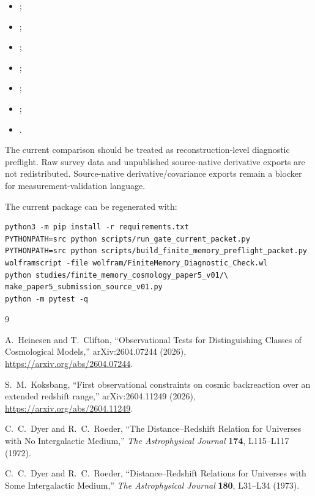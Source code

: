 \documentclass[11pt]{article}
\begin{document}
\begin{itemize}
\item {};
\item {};
\item {};
\item {};
\item {};
\item {};
\item {}.
\end{itemize}

The current comparison should be treated as reconstruction-level diagnostic
preflight. Raw survey data and unpublished source-native derivative exports are not
redistributed. Source-native derivative/covariance exports remain a blocker for
measurement-validation language.

The current package can be regenerated with:

\begin{verbatim}
python3 -m pip install -r requirements.txt
PYTHONPATH=src python scripts/run_gate_current_packet.py
PYTHONPATH=src python scripts/build_finite_memory_preflight_packet.py
wolframscript -file wolfram/FiniteMemory_Diagnostic_Check.wl
python studies/finite_memory_cosmology_paper5_v01/\
make_paper5_submission_source_v01.py
python -m pytest -q
\end{verbatim}

\begin{thebibliography}{9}

A.~Heinesen and T.~Clifton,
``Observational Tests for Distinguishing Classes of Cosmological Models,''
arXiv:2604.07244 (2026),
\url{https://arxiv.org/abs/2604.07244}.

S.~M.~Koksbang,
``First observational constraints on cosmic backreaction over an extended redshift range,''
arXiv:2604.11249 (2026),
\url{https://arxiv.org/abs/2604.11249}.

C.~C.~Dyer and R.~C.~Roeder,
``The Distance--Redshift Relation for Universes with No Intergalactic Medium,''
\emph{The Astrophysical Journal} \textbf{174}, L115--L117 (1972).

C.~C.~Dyer and R.~C.~Roeder,
``Distance--Redshift Relations for Universes with Some Intergalactic Medium,''
\emph{The Astrophysical Journal} \textbf{180}, L31--L34 (1973).

\end{thebibliography}
\end{document}
